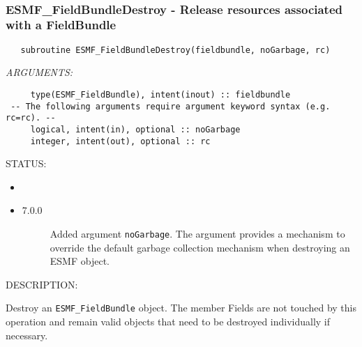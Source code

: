  
\mbox{}\hrulefill\ 
 
\subsubsection [ESMF\_FieldBundleDestroy] {ESMF\_FieldBundleDestroy - Release resources associated with a FieldBundle}


\begin{verbatim}   subroutine ESMF_FieldBundleDestroy(fieldbundle, noGarbage, rc)\end{verbatim}{\em ARGUMENTS:}
\begin{verbatim}     type(ESMF_FieldBundle), intent(inout) :: fieldbundle
 -- The following arguments require argument keyword syntax (e.g. rc=rc). --
     logical, intent(in), optional :: noGarbage
     integer, intent(out), optional :: rc\end{verbatim}
{\sf STATUS:}
   \begin{itemize}
   \item{}
   \item{}
   \begin{description}
   \item[7.0.0] Added argument {\tt noGarbage}.
   The argument provides a mechanism to override the default garbage collection
   mechanism when destroying an ESMF object.
   \end{description}
   \end{itemize}
  
{\sf DESCRIPTION:\\ }


   Destroy an {\tt ESMF\_FieldBundle} object. The member Fields are not
   touched by this operation and remain valid objects that need to be
   destroyed individually if necessary.
  
